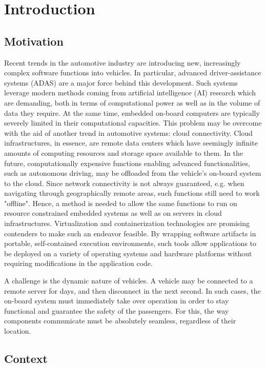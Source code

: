 
\chapter{Introduction}\label{chapter:introduction}


\section{Motivation}
Recent trends in the automotive industry are introducing new, increasingly complex software functions into vehicles. In particular, advanced driver-assistance systems (ADAS) are a major force behind this development. Such systems leverage modern methods coming from artificial intelligence (AI) research which are demanding, both in terms of computational power as well as in the volume of data they require. At the same time, embedded on-board computers are typically severely limited in their computational capacities. This problem may be overcome with the aid of another trend in automotive systems: cloud connectivity. Cloud infrastructures, in essence, are remote data centers which have seemingly infinite amounts of computing resources and storage space available to them. In the future, computationally expensive functions enabling advanced functionalities, such as autonomous driving, may be offloaded from the vehicle's on-board system to the cloud. Since network connectivity is not always guaranteed, e.g. when navigating through geographically remote areas, such functions still need to work "offline". Hence, a method is needed to allow the same functions to run on resource constrained embedded systems as well as on servers in cloud infrastructures. Virtualization and containerization technologies are promising contenders to make such an endeavor feasible. By wrapping software artifacts in portable, self-contained execution environments, such tools allow applications to be deployed on a variety of operating systems and hardware platforms without requiring modifications in the application code. 

A challenge is the dynamic nature of vehicles. A vehicle may be connected to a remote server for days, and then disconnect in the next second. In such cases, the on-board system must immediately take over operation in order to stay functional and guarantee the safety of the passengers. For this, the way components communicate must be absolutely seamless, regardless of their location.

%
%
%
%
%
%
%
%
%
%

\section{Context}

